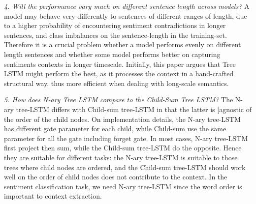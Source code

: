    \textit{4. Will the performance vary much on different sentence length across models?}
    A model may behave very differently to sentences of different ranges of
    length, due to a higher probability of encountering sentiment contradictions
    in longer sentences, and class imbalances on the sentence-length in the
    training-set.  Therefore it is a crucial problem whether a model performs
    evenly on different length sentences and whether some model performs better
    on capturing sentiments contexts in longer timescale. Initially, this paper
    argues that Tree LSTM might perform the best, as it processes the context in
    a hand-crafted structural way, thus more efficient when dealing with
    long-scale semantics.

    \textit{5. How does N-ary Tree LSTM compare to the Child-Sum Tree LSTM?}
    The N-ary tree-LSTM differs with Child-sum tree-LSTM in that the latter is
    [agnostic of the order of the child nodes. On implementation details, the
    N-ary tree-LSTM has different gate parameter for each child, while Child-sum
    use the same parameter for all the gate including forget gate. In most
    cases, N-ary tree-LSTM first project then sum, while the Child-sum tree-LSTM
    do the opposite. Hence they are suitable for different tasks: the N-ary
    tree-LSTM is suitable to those trees where child nodes are ordered, and the
    Child-sum tree-LSTM should work well on the order of child nodes does not
    contribute to the context. In the sentiment classification task, we need
    N-ary tree-LSTM since the word order is important to context extraction.
